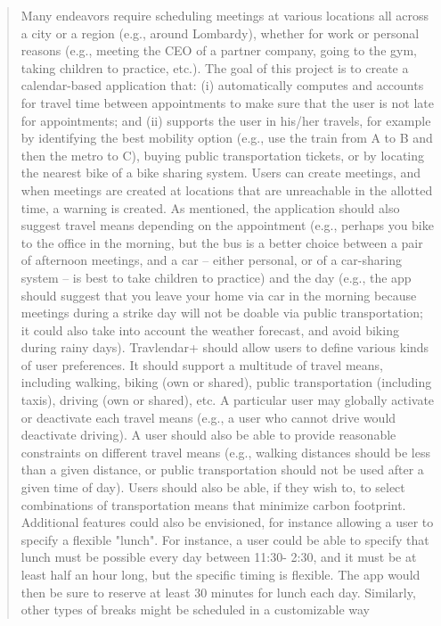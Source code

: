 \setcounter{page}{2}

\newpage
\begin{verse}
	Many endeavors require scheduling meetings at various locations all across a city or a region (e.g., around Lombardy), whether for work or personal reasons (e.g., meeting the CEO of a partner company, going to the gym, taking children to practice, etc.). The goal of this project is to create a calendar-based application that: (i) automatically computes and accounts for travel time between appointments to make sure that the user is not late for appointments; and (ii) supports the user in his/her travels, for example by identifying the best mobility option (e.g., use the train from A to B and then the metro to C), buying public transportation tickets, or by locating the nearest bike of a bike sharing system. Users can create meetings, and when meetings are created at locations that are unreachable in the allotted time, a warning is created. As mentioned, the application should also suggest travel means depending on the appointment (e.g., perhaps you bike to the office in the morning, but the bus is a better choice between a pair of afternoon meetings, and a car – either personal, or of a car-sharing system – is best to take children to practice) and the day (e.g., the app should suggest that you leave your home via car in the morning because meetings during a strike day will not be doable via public transportation; it could also take into account the weather forecast, and avoid biking during rainy days). Travlendar+ should allow users to define various kinds of user preferences. It should support a multitude of travel means, including walking, biking (own or shared), public transportation (including taxis), driving (own or shared), etc. A particular user may globally activate or deactivate each travel means (e.g., a user who cannot drive would deactivate driving). A user should also be able to provide reasonable constraints on different travel means (e.g., walking distances should be less than a given distance, or public transportation should not be used after a given time of day). Users should also be able, if they wish to, to select combinations of transportation means that minimize carbon footprint. Additional features could also be envisioned, for instance allowing a user to specify a flexible "lunch". For instance, a user could be able to specify that lunch must be possible every day between 11:30- 2:30, and it must be at least half an hour long, but the specific timing is flexible. The app would then be sure to reserve at least 30 minutes for lunch each day. Similarly, other types of breaks might be scheduled in a customizable way
\end{verse}
\newpage
{}
\tableofcontents
\newpage
{}
\listoffigures
{}

